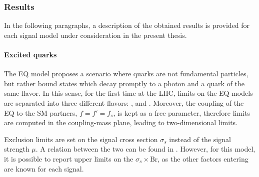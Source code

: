 \subsubsection{Results}
\label{subsubsec:results:results:bkgsig:results}

In the following paragraphs, a description of the obtained results is provided for each signal model under consideration in the present thesis.




\paragraph{Excited quarks}
\label{paragraph:results:results:bkgsig:results:qstar}

The \ac{EQ} model proposes a scenario where quarks are not fundamental particles, but rather bound states which decay promptly to a photon and a quark of the same flavor. In this sense, for the first time at the \ac{LHC}, limits on the \ac{EQ} models are separated into three different flavors: \qstar, \cstar and \bstar.
Moreover, the coupling of the \ac{EQ} to the \ac{SM} partners, \(f=f'=f_s\), is kept as a free parameter, therefore limits are computed in the coupling-mass plane, leading to two-dimensional limits.

Exclusion limits are set on the signal cross section \(\sigma_s\) instead of the signal strength \(\mu\). A relation between the two can be found in \Eqn{\ref{eq:strategy:stat_treatment:stat_model:mu_si}}. However, for this model, it is possible to report upper limits on the \(\sigma_s \times \text{Br}\), as the other factors entering \Eqn{\ref{eq:strategy:stat_treatment:stat_model:mu_si}} are known for each signal.


